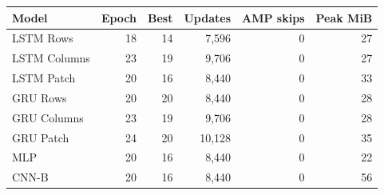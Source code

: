 \begin{tabular}{lrrrrr}
\toprule
Model & Epoch & Best & Updates & AMP skips & Peak MiB\\
\midrule
LSTM Rows & 18 & 14 & 7,596 & 0 & 27\\
LSTM Columns & 23 & 19 & 9,706 & 0 & 27\\
LSTM Patch & 20 & 16 & 8,440 & 0 & 33\\
GRU Rows & 20 & 20 & 8,440 & 0 & 28\\
GRU Columns & 23 & 19 & 9,706 & 0 & 28\\
GRU Patch & 24 & 20 & 10,128 & 0 & 35\\
MLP & 20 & 16 & 8,440 & 0 & 22\\
CNN-B & 20 & 16 & 8,440 & 0 & 56\\
\bottomrule
\end{tabular}
